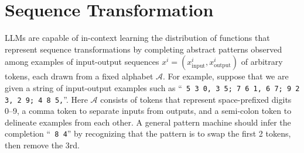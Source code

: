 \documentclass{article}
\renewcommand{\tt}[1]{{\texttt{#1}}}
\begin{document}
\section{Sequence Transformation}
\label{sec:sequence_transformation}
\vspace{-3mm}
LLMs are capable of in-context learning the distribution of functions that represent sequence transformations by completing abstract patterns observed among examples of input-output sequences $x^{i} = (x^{i}_{\text{input}}, x^{i}_{\text{output}})$ of arbitrary tokens, each drawn from a fixed alphabet $\mathcal{A}$. For example, suppose that we are given a string of input-output examples such as ``\tt{ 5 3 0, 3 5; 7 6 1, 6 7; 9 2 3, 2 9; 4 8 5,}''. Here $\mathcal{A}$ consists of tokens that represent space-prefixed digits 0--9, a comma token to separate inputs from outputs, and a semi-colon token to delineate examples from each other. A general pattern machine should infer the completion ``\tt{ 8 4}'' by recognizing that the pattern is to swap the first 2 tokens, then remove the 3rd.
\end{document}
